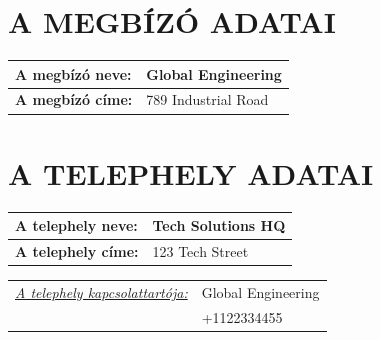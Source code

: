 \documentclass[a4paper,12pt]{article}
\renewcommand{\arraystretch}{0.5}
\begin{document}
	
	\section{A MEGBÍZÓ ADATAI}
		\begin{adjustwidth}{1cm}{0cm}
			
			\vspace{0.5em} %
			
			\noindent
			\renewcommand{\arraystretch}{1.4} %
			
			\begin{tabularx}{\textwidth}{ | p{4.5cm} | X | } %
				\hline
				\textbf{A megbízó neve:} & \textbf{Global Engineering} \\ \hline
				\textbf{A megbízó címe:} & 789 Industrial Road \\ \hline
			\end{tabularx}
			
		\end{adjustwidth}
		
	\section{A TELEPHELY ADATAI}
		\begin{adjustwidth}{1cm}{0cm}
			\vspace{0.5em} %
			
			\noindent
			\renewcommand{\arraystretch}{1.4} %
			
			
			\begin{tabularx}{\textwidth}{ | p{4.5cm} | X | } %
				\hline
				\textbf{A telephely neve:} & \textbf{Tech Solutions HQ} \\ \hline
				\textbf{A telephely címe:} & 123 Tech Street \\ \hline
			\end{tabularx}
			
			\vspace{0.5em} %
			
			\begin{tabular}{ p{5.5cm} p{8cm} } 
				\textit{\underline{A telephely kapcsolattartója:}} & Global Engineering \\  & +1122334455
			\end{tabular}
			
		\end{adjustwidth}
	
\end{document}

